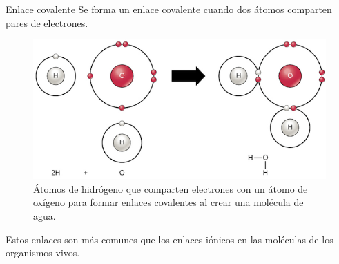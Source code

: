 \begin{infocard}{Enlace covalente}
    Se forma un enlace covalente cuando dos átomos comparten pares de electrones.
    \begin{figure}[H]
        \centering
        \includegraphics[width=0.9\linewidth]{../images/2e56e620e79858d5dca7103b22dbde6eb5c52f0c}
        \caption{Átomos de hidrógeno que comparten electrones con un átomo de oxígeno para formar enlaces covalentes al crear una molécula de agua.}
        \label{fig:enlace_covalente}
    \end{figure}

    Estos enlaces son más comunes que los enlaces iónicos en las moléculas de los organismos vivos.
\end{infocard}
